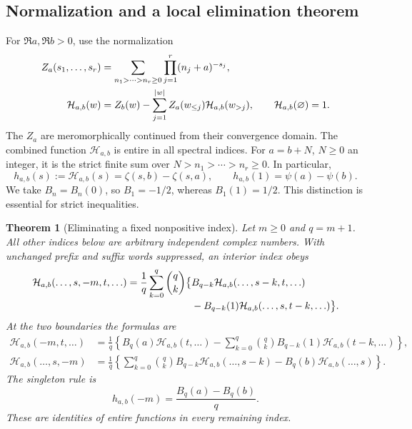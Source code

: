 \documentclass[11pt,a4paper]{article}
\numberwithin{equation}{section}
\newtheorem{theorem}{Theorem}[section]
\theoremstyle{definition}
\theoremstyle{remark}
\begin{document}
\subsection{Normalization and a local elimination theorem}

For $\Re a,\Re b>0$, use the normalization
\begin{align}
 Z_a(s_1,\ldots,s_r)
  &=\sum_{n_1>\cdots>n_r\ge0}
                  \prod_{j=1}^r(n_j+a)^{-s_j},\notag\\
 \mathcal H_{a,b}(w)
  &=Z_b(w)-\sum_{j=1}^{|w|}Z_a(w_{\le j})
                              \mathcal H_{a,b}(w_{>j}),
 \qquad \mathcal H_{a,b}(\varnothing)=1.
 \label{harm:normalization}
\end{align}
The $Z_a$ are meromorphically continued from their convergence domain.
The combined function $\mathcal H_{a,b}$ is entire in all spectral
indices. For $a=b+N$, $N\ge0$ an integer, it is the strict finite sum
over $N>n_1>\cdots>n_r\ge0$. In particular,
\begin{equation}
 h_{a,b}(s):=\mathcal H_{a,b}(s)
      =\zeta(s,b)-\zeta(s,a),\qquad
 h_{a,b}(1)=\psi(a)-\psi(b).
 \label{harm:h}
\end{equation}
We take $B_n=B_n(0)$, so $B_1=-1/2$, whereas $B_1(1)=1/2$.
This distinction is essential for strict inequalities.

\begin{theorem}[Eliminating a fixed nonpositive index]
\label{harm:local}
Let $m\ge0$ and $q=m+1$. All other indices below are arbitrary
independent complex numbers. With unchanged prefix and suffix words
suppressed, an interior index obeys
\begin{align}
 \mathcal H_{a,b}(\ldots,s,-m,t,\ldots)
  =\frac1q\sum_{k=0}^q\binom qk\bigl\{
   &B_{q-k}\mathcal H_{a,b}(\ldots,s-k,t,\ldots)\notag\\[-2pt]
   &-B_{q-k}(1)\mathcal H_{a,b}(\ldots,s,t-k,\ldots)
   \bigr\}.
 \label{harm:interior}
\end{align}
At the two boundaries the formulas are
\begin{align}
 \mathcal H_{a,b}(-m,t,\ldots)
 &=\frac1q\left\{B_q(a)\mathcal H_{a,b}(t,\ldots)
  -\sum_{k=0}^q\binom qk B_{q-k}(1)
                        \mathcal H_{a,b}(t-k,\ldots)\right\},
 \label{harm:top}\\
 \mathcal H_{a,b}(\ldots,s,-m)
 &=\frac1q\left\{\sum_{k=0}^q\binom qk B_{q-k}
                  \mathcal H_{a,b}(\ldots,s-k)
                     -B_q(b)\mathcal H_{a,b}(\ldots,s)\right\}.
 \label{harm:bottom}
\end{align}
The singleton rule is
\begin{equation}
             h_{a,b}(-m)=\frac{B_q(a)-B_q(b)}q.
 \label{harm:singleton}
\end{equation}
These are identities of entire functions in every remaining index.
\end{theorem}
\end{document}
